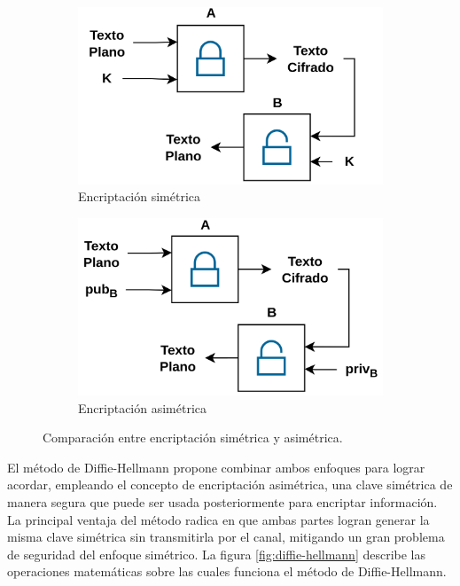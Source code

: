 \begin{figure}[ht!]
    \centering
    \begin{subfigure}[b]{0.45\textwidth}
        \centering
        \includegraphics[width=\textwidth]{../figs/1_sim_encr.png}
        \caption{Encriptación simétrica}
        \label{fig:simetrica}
    \end{subfigure}
    \hfill
    \begin{subfigure}[b]{0.45\textwidth}
        \centering
        \includegraphics[width=\textwidth]{../figs/1_asim_encr.png}
        \caption{Encriptación asimétrica}
        \label{fig:asimetrica}
    \end{subfigure}
    \caption{Comparación entre encriptación simétrica y asimétrica.}
    \label{fig:encriptacion}
\end{figure}

El método de Diffie-Hellmann propone combinar ambos enfoques para lograr acordar, empleando el concepto de encriptación asimétrica, una clave simétrica de manera segura que puede ser usada posteriormente para encriptar información. La principal ventaja del método radica en que ambas partes logran generar la misma clave simétrica sin transmitirla por el canal, mitigando un gran problema de seguridad del enfoque simétrico. La figura \ref{fig:diffie-hellmann} describe las operaciones matemáticas sobre las cuales funciona el método de Diffie-Hellmann.

